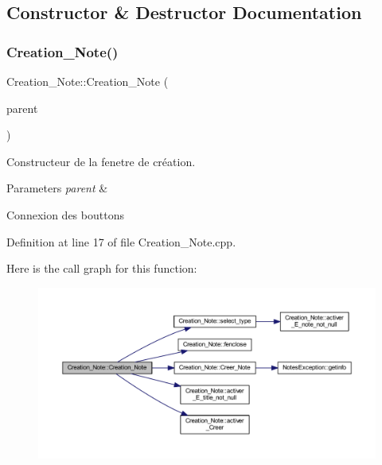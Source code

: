 \subsection{Constructor \& Destructor Documentation}
\mbox{\label{class_creation___note_a76278cf9f0de87cd61f204aafcebd5d2}} 
\subsubsection{\texorpdfstring{Creation\+\_\+\+Note()}{Creation\_Note()}}
{\footnotesize\ttfamily Creation\+\_\+\+Note\+::\+Creation\+\_\+\+Note (\begin{DoxyParamCaption}\item[{Q\+Widget $\ast$}]{parent }\end{DoxyParamCaption})}



Constructeur de la fenetre de création. 


\begin{DoxyParams}{Parameters}
{\em parent} & \\
\hline
\end{DoxyParams}
Connexion des bouttons 

Definition at line 17 of file Creation\+\_\+\+Note.\+cpp.

Here is the call graph for this function\+:\nopagebreak
\begin{figure}[H]
\begin{center}
\leavevmode
\includegraphics[width=350pt]{class_creation___note_a76278cf9f0de87cd61f204aafcebd5d2_cgraph}
\end{center}
\end{figure}


